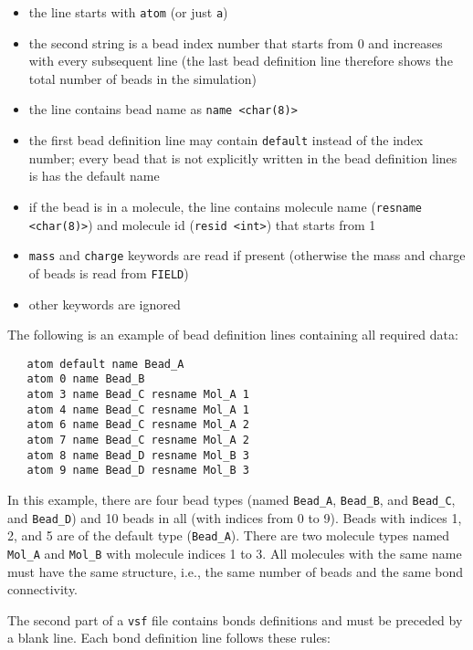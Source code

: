\begin{itemize}[topsep=0pt,itemsep=0pt]
  \item the line starts with \texttt{atom} (or just \texttt{a})
  \item the second string is a bead index number that starts from 0 and
    increases with every subsequent line (the last bead definition line
    therefore shows the total number of beads in the simulation)
  \item the line contains bead name as \texttt{name <char(8)>}
  \item the first bead definition line may contain \texttt{default} instead
    of the index number; every bead that is not explicitly written in the
    bead definition lines is has the default name
  \item if the bead is in a molecule, the line contains molecule name
    (\texttt{resname <char(8)>}) and molecule id (\texttt{resid <int>})
    that starts from 1
  \item \texttt{mass} and \texttt{charge} keywords are read if present
    (otherwise the mass and charge of beads is read from \texttt{FIELD})
  \item other keywords are ignored
\end{itemize}

The following is an example of bead definition lines containing all
required data:

\begin{verbatim}
   atom default name Bead_A
   atom 0 name Bead_B
   atom 3 name Bead_C resname Mol_A 1
   atom 4 name Bead_C resname Mol_A 1
   atom 6 name Bead_C resname Mol_A 2
   atom 7 name Bead_C resname Mol_A 2
   atom 8 name Bead_D resname Mol_B 3
   atom 9 name Bead_D resname Mol_B 3
\end{verbatim}

In this example, there are four bead types (named \texttt{Bead\_A},
\texttt{Bead\_B}, and \texttt{Bead\_C}, and \texttt{Bead\_D}) and 10 beads
in all (with indices from 0 to 9). Beads with indices 1, 2, and 5 are of
the default type (\texttt{Bead\_A}). There are two molecule types named
\texttt{Mol\_A} and \texttt{Mol\_B} with molecule indices 1 to 3. All
molecules with the same name must have the same structure, i.e., the same
number of beads and the same bond connectivity.

The second part of a \texttt{vsf} file contains bonds definitions and must
be preceded by a blank line. Each bond definition line follows these rules:

